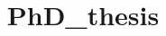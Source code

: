 \documentclass[a4paper,12pt,times,numbered,print, custommargin]{Classes/PhDThesisPSnPDF}
\title{PhD_thesis} %
\begin{document}
\frontmatter

\maketitle







\tableofcontents

\listoffigures

\listoftables

\newpage
\printglossaries


\printnomenclature

\mainmatter







\begin{spacing}{0.9}



\cleardoublepage





\end{spacing}
\end{document}
